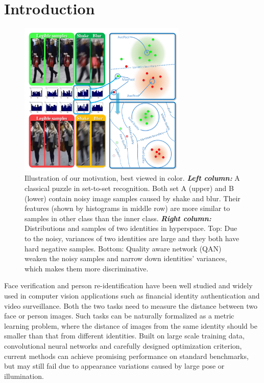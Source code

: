 \section{Introduction}


\begin{figure}[!t]
  \centering
  \includegraphics[width=8cm]{figure_first.pdf}
  \caption{Illustration of our motivation, best viewed in color. \emph{\textbf{Left column:}} A classical puzzle in set-to-set recognition. Both set A (upper) and B (lower) contain noisy image samples caused by shake and blur. Their features (shown by histograms in middle row) are more similar to samples in other class than the inner class.  \emph{\textbf{Right column:}} Distributions and samples of two identities in hyperspace. Top: Due to the noisy, variances of two identities are large and they both have hard negative samples. Bottom: Quality aware network (QAN) weaken the noisy samples and narrow down identities' variances, which makes them more discriminative.}
  \label{fig:fig1}
\end{figure}

Face verification \cite{sun2014deep1,learnedlabeled,sun2014deep,taigman2014deepface,schroff2015facenet} and person re-identification \cite{gong2014person,farenzena2010person,zheng2011person,li2014deepreid} have been well studied and widely used in computer vision applications such as financial identity authentication and video surveillance. Both the two tasks need to measure the distance between two face or person images. Such tasks can be naturally formalized as a metric learning problem, where the distance of images from the same identity should be smaller than that from different identities. Built on large scale training data, convolutional neural networks and carefully designed optimization criterion, current methods can achieve promising performance on standard benchmarks, but may still fail due to appearance variations caused by large pose or illumination.

